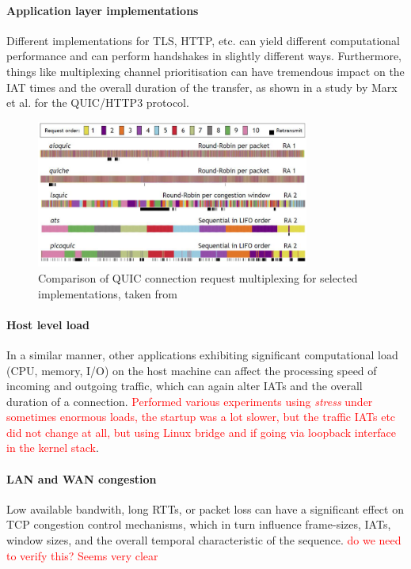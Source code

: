 \documentclass{article}
\begin{document}
\paragraph{Application layer implementations}
Different implementations for TLS, HTTP, etc. can yield different computational performance and can perform handshakes in slightly different ways. Furthermore, things like multiplexing channel prioritisation can have tremendous impact on the IAT times and the overall duration of the transfer, as shown in a study by Marx et al.  \cite{marx2020same} for the QUIC/HTTP3 protocol.

\begin{figure}
\centering
\includegraphics[width=0.8\textwidth]{images/Proto_differences_small.png}
\caption{Comparison of QUIC connection request multiplexing for selected implementations, taken from \cite{marx2020same}}
\end{figure}


\paragraph{Host level load}
In a similar manner, other applications exhibiting significant computational load (CPU, memory, I/O) on the host machine can affect the processing speed of incoming and outgoing traffic, which can again alter IATs and the  overall duration of a connection. \textcolor{red}{Performed various experiments using \textit{stress} under sometimes enormous loads, the startup was a lot slower, but the traffic IATs etc did not change at all, but using Linux bridge and if going via loopback interface in the kernel stack}.

\paragraph{LAN and WAN congestion}
Low available bandwith, long RTTs, or packet loss can have a significant effect on TCP congestion control mechanisms, which in turn influence frame-sizes, IATs, window sizes, and the overall temporal characteristic of the sequence. \textcolor{red}{do we need to verify this? Seems very clear}
\end{document}
